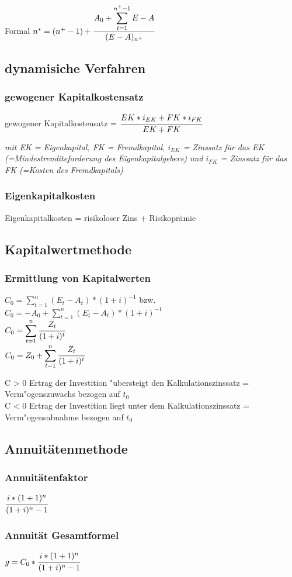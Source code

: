 \documentclass[a4paper,12pt]{scrartcl}
\begin{document}
Formal $n^* = (n^+ - 1) + \cfrac{A_0 + \displaystyle\sum_{t=1}^{n^+-1} E-A}{(E - A)_{n^+}}$

\subsection{dynamisiche Verfahren}
\subsubsection{gewogener Kapitalkostensatz}
gewogener Kapitalkostensatz = $\cfrac{EK * i_{EK} + FK * i_{FK}}{EK + FK}$ \\
\vspace*{5mm}

\textit{
mit EK = Eigenkapital, FK = Fremdkapital, $i_{EK}$ = Zinssatz für das EK (=Mindestrenditeforderung des Eigenkapitalgebers) und $i_{FK}$ = Zinssatz für das FK (=Kosten des Fremdkapitals)
}
\subsubsection{Eigenkapitalkosten}
Eigenkapitalkosten = risikoloser Zins + Risikoprämie

\subsection{Kapitalwertmethode}
\subsubsection{Ermittlung von Kapitalwerten}
$C_0 = \displaystyle\sum_{t=1}^{n} (E_t - A_t) * (1+i)^{-1}$ bzw. \\
$C_0 = -A_0 + \displaystyle\sum_{t=1}^{n} (E_t - A_t) * (1+i)^{-1}$ \\
$C_0 = \displaystyle\sum_{t=1}^{n} \cfrac{Z_t}{(1+i)^t}$ \\
$C_0 = Z_0 + \displaystyle\sum_{t=1}^{n} \cfrac{Z_t}{(1+i)^t}$ 
\\
\vspace*{5mm}

C > 0 Ertrag der Investition "ubersteigt den Kalkulationszinssatz = Verm"ogenszuwachs bezogen auf $t_0$ \\
C < 0 Ertrag der Investition liegt unter dem Kalkulationszinssatz = Verm"ogensabnahme bezogen auf $t_0$

\subsection{Annuitätenmethode}
\subsubsection{Annuitätenfaktor}
$\cfrac{i * (1+1)^n}{(1+i)^n -1}$
\subsubsection{Annuität Gesamtformel}
$ g = C_0 * \cfrac{i * (1+1)^n}{(1+i)^n -1}$
\end{document}
